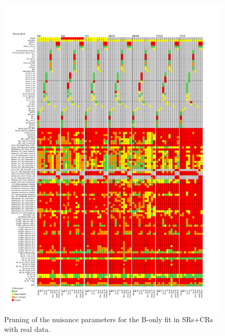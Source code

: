 \begin{figure}[htbp]
	\centering
	\includegraphics[width=.85\textwidth]{Chapters/CH8/figures/BONLY_CRSR_DL1rc_unblind/Pruning}
	\caption{Pruning of the nuisance parameters for the B-only fit in SRs+CRs with real data.}%
	\label{fig:stat:tzc:splusb:crsr:pruning_unb}
\end{figure}

